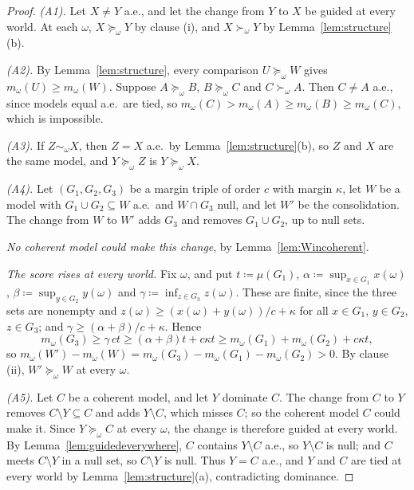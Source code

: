\documentclass[11pt]{article}
\theoremstyle{plain}
\theoremstyle{definition}
\begin{document}
\begin{proof}
\emph{(A1).} Let $X\ne Y$ a.e., and let the change from $Y$ to $X$ be guided at every world. At
each $\omega$, $X\succeq_\omega Y$ by clause (i), and $X\succ_\omega Y$ by
Lemma~\ref{lem:structure}(b).

\emph{(A2).} By Lemma~\ref{lem:structure}, every comparison $U\succeq_\omega W$ gives
$m_\omega(U)\ge m_\omega(W)$. Suppose $A\succeq_\omega B$, $B\succeq_\omega C$ and $C\succ_\omega
A$. Then $C\ne A$ a.e., since models equal a.e.\ are tied, so $m_\omega(C)>m_\omega(A)\ge
m_\omega(B)\ge m_\omega(C)$, which is impossible.

\emph{(A3).} If $Z\sim_\omega X$, then $Z=X$ a.e.\ by Lemma~\ref{lem:structure}(b), so $Z$ and
$X$ are the same model, and $Y\succeq_\omega Z$ is $Y\succeq_\omega X$.

\emph{(A4).} Let $(G_1,G_2,G_3)$ be a margin triple of order $c$ with margin $\kappa$, let $W$
be a model with $G_1\cup G_2\subseteq W$ a.e.\ and $W\cap G_3$ null, and let $W'$ be the
consolidation. The change from $W$ to $W'$ adds $G_3$ and removes $G_1\cup G_2$, up to null
sets.

\emph{No coherent model could make this change}, by Lemma~\ref{lem:Wincoherent}.

\emph{The score rises at every world.} Fix $\omega$, and put $t\coloneqq\mu(G_1)$,
$\alpha\coloneqq\sup_{x\in G_1}x(\omega)$, $\beta\coloneqq\sup_{y\in G_2}y(\omega)$ and
$\gamma\coloneqq\inf_{z\in G_3}z(\omega)$. These are finite, since the three sets are nonempty
and $z(\omega)\ge(x(\omega)+y(\omega))/c+\kappa$ for all $x\in G_1$, $y\in G_2$, $z\in G_3$; and
$\gamma\ge(\alpha+\beta)/c+\kappa$. Hence
\[
  m_\omega(G_3)\ge\gamma\,ct\ge(\alpha+\beta)t+c\kappa t\ge m_\omega(G_1)+m_\omega(G_2)+c\kappa t,
\]
so $m_\omega(W')-m_\omega(W)=m_\omega(G_3)-m_\omega(G_1)-m_\omega(G_2)>0$. By clause (ii),
$W'\succeq_\omega W$ at every $\omega$.

\emph{(A5).} Let $C$ be a coherent model, and let $Y$ dominate $C$. The change from $C$ to $Y$
removes $C\setminus Y\subseteq C$ and adds $Y\setminus C$, which misses $C$; so the coherent
model $C$ could make it. Since $Y\succeq_\omega C$ at every $\omega$, the change is therefore
guided at every world. By Lemma~\ref{lem:guidedeverywhere}, $C$ contains $Y\setminus C$ a.e., so
$Y\setminus C$ is null; and $C$ meets $C\setminus Y$ in a null set, so $C\setminus Y$ is null.
Thus $Y=C$ a.e., and $Y$ and $C$ are tied at every world by Lemma~\ref{lem:structure}(a),
contradicting dominance.
\end{proof}
\end{document}
